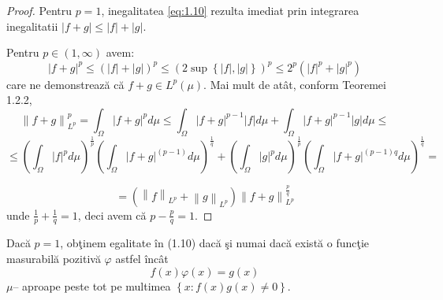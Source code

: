 \documentclass[a4paper,12pt,oneside]{report}
\begin{document}
\begin{proof}
Pentru \(p  = 1\), inegalitatea \ref{eq:1.10} rezulta imediat prin integrarea inegalitatii \(\left | f + g \right |\leq \left | f \right | + \left | g \right |\).

Pentru \(p \in \left ( 1 , \infty  \right )\) avem:
\begin{displaymath}
  \left | f + g  \right |^{p}\leq \left ( \left | f \right | +\left | g \right |\right )^{p}\leq \left ( 2 \sup\left \{ \left | f \right |,\left | g \right | \right \} \right )^{p}\leq 2^{p}\left ( \left | f \right |^{p}  + \left | g \right |^{p}\right )
\end{displaymath}
care ne demonstreaz\u{a} c\u{a} \(f + g \in L^{p}\left ( \mu  \right )\). Mai mult de at\^{a}t, conform Teoremei 1.2.2,
\begin{displaymath}
  \left \| f + g  \right \|_{L^{p}}^{p} = \int_{\Omega }\left | f + g \right |^{p}d\mu \leq \int_{\Omega }\left | f + g \right |^{p - 1}\left | f \right |d\mu + \int_{\Omega }\left | f + g  \right |^{p - 1}\left | g \right |d\mu \leq
\end{displaymath}
\begin{displaymath}
  \leq\left ( \int_{\Omega }\left | f \right |^{p}d\mu  \right )^{\frac{1}{p}}\left ( \int_{\Omega }\left | f + g  \right | ^{\left ( p - 1 \right )}d\mu \right )^{\frac{1}{q}}+ \left ( \int_{\Omega }\left | g \right |^{p}d\mu  \right )^{\frac{1}{p}}\left ( \int_{\Omega} \left | f + g \right |^{\left ( p - 1 \right )q}d\mu \right )^{\frac{1}{q}}=
\end{displaymath}

\begin{displaymath}
  =\left ( \left \| f \right \|_{L^{p}} + \left \| g \right \|_{L^{p}} \right )\left \| f + g  \right \|_{L^{p}}^{\frac{p}{q}}
\end{displaymath}
unde \(\frac{1}{p} + \frac{1}{q} = 1\), deci avem c\u{a} \(p - \frac{p}{q} = 1\). 	
\end{proof}



Dac\u{a} \(p = 1\), ob\c{t}inem egalitate \^{i}n (1.10) dac\u{a} \c{s}i numai dac\u{a} exist\u{a} o func\c{t}ie masurabil\u{a} pozitiv\u{a} \(\varphi\) astfel \^{i}nc\^{a}t
\begin{displaymath}
  f\left ( x \right )\varphi \left ( x \right ) = g\left ( x \right )
\end{displaymath}
\(\mu –\) aproape peste tot pe multimea \(\left \{ x : f\left ( x \right )g\left ( x \right )\neq 0 \right \}\).
\end{document}
